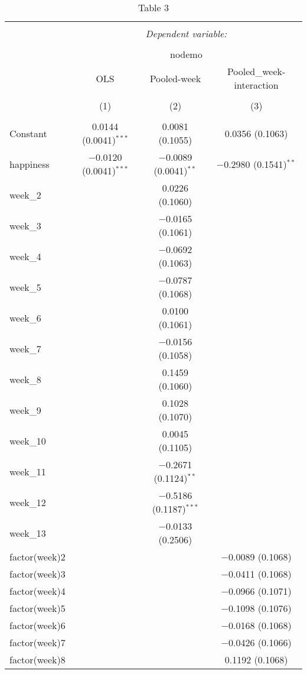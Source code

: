 \documentclass[
]{article}
\begin{document}
\begin{table}[!htbp] \centering 
  \caption{Table 3} 
  \label{} 
\small 
\begin{tabular}{@{\extracolsep{5pt}}lccc} 
\\[-1.8ex]\hline 
\hline \\[-1.8ex] 
 & \multicolumn{3}{c}{\textit{Dependent variable:}} \\ 
\cline{2-4} 
\\[-1.8ex] & \multicolumn{3}{c}{nodemo} \\ 
 & OLS & Pooled-week & Pooled_week-interaction \\ 
\\[-1.8ex] & (1) & (2) & (3)\\ 
\hline \\[-1.8ex] 
 Constant & 0.0144 (0.0041)$^{***}$ & 0.0081 (0.1055) & 0.0356 (0.1063) \\ 
  happiness & $-$0.0120 (0.0041)$^{***}$ & $-$0.0089 (0.0041)$^{**}$ & $-$0.2980 (0.1541)$^{**}$ \\ 
  week\_2 &  & 0.0226 (0.1060) &  \\ 
  week\_3 &  & $-$0.0165 (0.1061) &  \\ 
  week\_4 &  & $-$0.0692 (0.1063) &  \\ 
  week\_5 &  & $-$0.0787 (0.1068) &  \\ 
  week\_6 &  & 0.0100 (0.1061) &  \\ 
  week\_7 &  & $-$0.0156 (0.1058) &  \\ 
  week\_8 &  & 0.1459 (0.1060) &  \\ 
  week\_9 &  & 0.1028 (0.1070) &  \\ 
  week\_10 &  & 0.0045 (0.1105) &  \\ 
  week\_11 &  & $-$0.2671 (0.1124)$^{**}$ &  \\ 
  week\_12 &  & $-$0.5186 (0.1187)$^{***}$ &  \\ 
  week\_13 &  & $-$0.0133 (0.2506) &  \\ 
  factor(week)2 &  &  & $-$0.0089 (0.1068) \\ 
  factor(week)3 &  &  & $-$0.0411 (0.1068) \\ 
  factor(week)4 &  &  & $-$0.0966 (0.1071) \\ 
  factor(week)5 &  &  & $-$0.1098 (0.1076) \\ 
  factor(week)6 &  &  & $-$0.0168 (0.1068) \\ 
  factor(week)7 &  &  & $-$0.0426 (0.1066) \\ 
  factor(week)8 &  &  & 0.1192 (0.1068) \\ 

\end{tabular}
\end{table}
\end{document}
